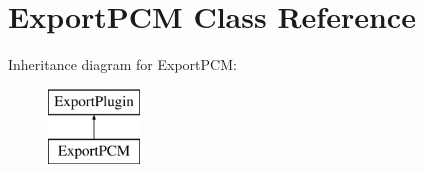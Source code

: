 \hypertarget{class_export_p_c_m}{}\section{Export\+P\+CM Class Reference}
\label{class_export_p_c_m}
Inheritance diagram for Export\+P\+CM\+:\begin{figure}[H]
\begin{center}
\leavevmode
\includegraphics[height=2.000000cm]{class_export_p_c_m}
\end{center}
\end{figure}
